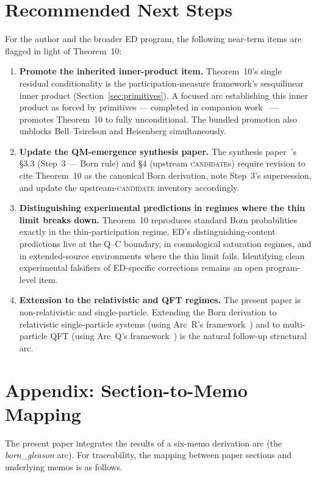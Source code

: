 \documentclass[11pt,a4paper]{article}
\begin{document}
\section{Recommended Next Steps}

For the author and the broader ED program, the following near-term items are flagged in light of Theorem~10:

\begin{enumerate}
  \item \textbf{Promote the inherited inner-product item.} Theorem~10's single residual conditionality is the participation-measure framework's sesquilinear inner product (Section~\ref{sec:primitives}). A focused arc establishing this inner product as forced by primitives --- completed in companion work~\cite{u2discrete,u2continuum} --- promotes Theorem~10 to fully unconditional. The bundled promotion also unblocks Bell--Tsirelson and Heisenberg simultaneously.
  \item \textbf{Update the QM-emergence synthesis paper.} The synthesis paper~\cite{phase1}'s \S 3.3 (Step~3 --- Born rule) and \S 4 (upstream \textsc{candidate}s) require revision to cite Theorem~10 as the canonical Born derivation, note Step~3's supersession, and update the upstream-\textsc{candidate} inventory accordingly.
  \item \textbf{Distinguishing experimental predictions in regimes where the thin limit breaks down.} Theorem~10 reproduces standard Born probabilities exactly in the thin-participation regime. ED's distinguishing-content predictions live at the Q--C boundary, in cosmological saturation regimes, and in extended-source environments where the thin limit fails. Identifying clean experimental falsifiers of ED-specific corrections remains an open program-level item.
  \item \textbf{Extension to the relativistic and QFT regimes.} The present paper is non-relativistic and single-particle. Extending the Born derivation to relativistic single-particle systems (using Arc~R's framework~\cite{arcr}) and to multi-particle QFT (using Arc~Q's framework~\cite{arcq}) is the natural follow-up structural arc.
\end{enumerate}

\section*{Appendix: Section-to-Memo Mapping}

The present paper integrates the results of a six-memo derivation arc (the \emph{born\_gleason} arc). For traceability, the mapping between paper sections and underlying memos is as follows.
\end{document}
